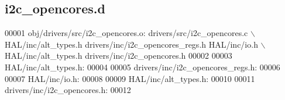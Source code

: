 \subsection{i2c\+\_\+opencores.\+d}
\label{lms__ctr__bsp_2obj_2drivers_2src_2i2c__opencores_8d_source}

\begin{DoxyCode}
00001 obj/drivers/src/i2c\_opencores.o: drivers/src/i2c\_opencores.c \(\backslash\)
 HAL/inc/alt\_types.h drivers/inc/i2c\_opencores\_regs.h HAL/inc/io.h \(\backslash\)
 HAL/inc/alt\_types.h drivers/inc/i2c\_opencores.h
00002 
00003 HAL/inc/alt\_types.h:
00004 
00005 drivers/inc/i2c\_opencores\_regs.h:
00006 
00007 HAL/inc/io.h:
00008 
00009 HAL/inc/alt\_types.h:
00010 
00011 drivers/inc/i2c\_opencores.h:
00012 \end{DoxyCode}
